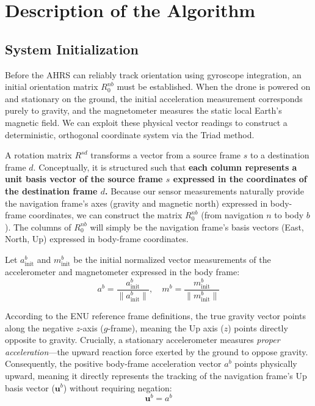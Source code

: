 \documentclass{article}
\begin{document}
\section{Description of the Algorithm}

\subsection{System Initialization}

Before the AHRS can reliably track orientation using gyroscope integration, an initial orientation matrix $R_0^{nb}$ must be established. When the drone is powered on and stationary on the ground, the initial acceleration measurement corresponds purely to gravity, and the magnetometer measures the static local Earth's magnetic field. We can exploit these physical vector readings to construct a deterministic, orthogonal coordinate system via the Triad method.

A rotation matrix $R^{sd}$ transforms a vector from a source frame $s$ to a destination frame $d$. Conceptually, it is structured such that \textbf{each column represents a unit basis vector of the source frame $s$ expressed in the coordinates of the destination frame $d$.} Because our sensor measurements naturally provide the navigation frame's axes (gravity and magnetic north) expressed in body-frame coordinates, we can construct the matrix $R_0^{nb}$ (from navigation $n$ to body $b$). The columns of $R_0^{nb}$ will simply be the navigation frame's basis vectors (East, North, Up) expressed in body-frame coordinates.

\vspace{1em}
\noindent Let $a_{\text{init}}^b$ and $m_{\text{init}}^b$ be the initial normalized vector measurements of the accelerometer and magnetometer expressed in the body frame:
\[
a^b = \frac{a_{\text{init}}^b}{\|a_{\text{init}}^b\|}, \quad m^b = \frac{m_{\text{init}}^b}{\|m_{\text{init}}^b\|}
\]

\noindent According to the ENU reference frame definitions, the true gravity vector points along the negative $z$-axis ($g$-frame), meaning the Up axis ($z$) points directly opposite to gravity. Crucially, a stationary accelerometer measures \textit{proper acceleration}---the upward reaction force exerted by the ground to oppose gravity. Consequently, the positive body-frame acceleration vector $a^b$ points physically upward, meaning it directly represents the tracking of the navigation frame's Up basis vector ($\mathbf{u}^b$) without requiring negation:
\[
\mathbf{u}^b = a^b
\]
\end{document}
